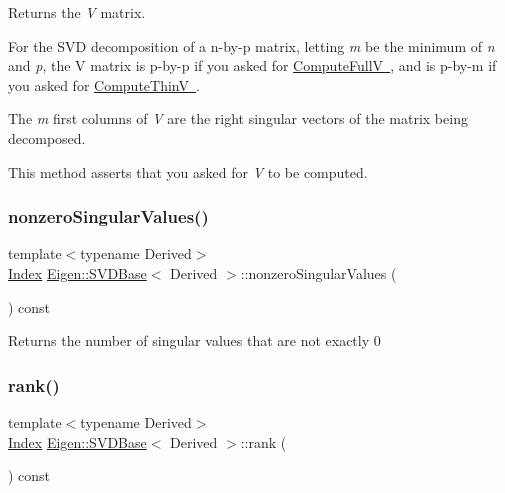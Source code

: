 \begin{DoxyReturn}{Returns}
the {\itshape V} matrix.
\end{DoxyReturn}
For the S\+VD decomposition of a n-\/by-\/p matrix, letting {\itshape m} be the minimum of {\itshape n} and {\itshape p}, the V matrix is p-\/by-\/p if you asked for \mbox{\hyperlink{}{Compute\+FullV }}, and is p-\/by-\/m if you asked for \mbox{\hyperlink{}{Compute\+ThinV }}.

The {\itshape m} first columns of {\itshape V} are the right singular vectors of the matrix being decomposed.

This method asserts that you asked for {\itshape V} to be computed. \mbox{\label{class_eigen_1_1_s_v_d_base_afe8a555f38393a319a71ec0f0331c9ef}} 
\subsubsection{\texorpdfstring{nonzeroSingularValues()}{nonzeroSingularValues()}}
{\footnotesize\ttfamily template$<$typename Derived$>$ \\
\mbox{\hyperlink{class_eigen_1_1_s_v_d_base_a6229a37997eca1072b52cca5ee7a2bec}{Index}} \mbox{\hyperlink{class_eigen_1_1_s_v_d_base}{Eigen\+::\+S\+V\+D\+Base}}$<$ Derived $>$\+::nonzero\+Singular\+Values (\begin{DoxyParamCaption}{ }\end{DoxyParamCaption}) const\hspace{0.3cm}{\ttfamily [inline]}}

\begin{DoxyReturn}{Returns}
the number of singular values that are not exactly 0 
\end{DoxyReturn}
\mbox{\label{class_eigen_1_1_s_v_d_base_a30b89e24f42f1692079eea31b361d26a}} 
\subsubsection{\texorpdfstring{rank()}{rank()}}
{\footnotesize\ttfamily template$<$typename Derived$>$ \\
\mbox{\hyperlink{class_eigen_1_1_s_v_d_base_a6229a37997eca1072b52cca5ee7a2bec}{Index}} \mbox{\hyperlink{class_eigen_1_1_s_v_d_base}{Eigen\+::\+S\+V\+D\+Base}}$<$ Derived $>$\+::rank (\begin{DoxyParamCaption}{ }\end{DoxyParamCaption}) const\hspace{0.3cm}{\ttfamily [inline]}}


